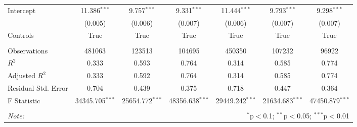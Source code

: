 \begin{tabular}{@{\extracolsep{5pt}}lcccccc}
Intercept & 11.386$^{***}$ & 9.757$^{***}$ & 9.331$^{***}$ & 11.444$^{***}$ & 9.793$^{***}$ & 9.298$^{***}$ \\
& (0.005) & (0.006) & (0.007) & (0.006) & (0.007) & (0.007) \\
Controls & True & True & True & True & True & True \\
\hline \\[-1.8ex]
 Observations & 481063 & 123513 & 104695 & 450350 & 107232 & 96922 \\
 $R^2$ & 0.333 & 0.593 & 0.764 & 0.314 & 0.585 & 0.774 \\
 Adjusted $R^2$ & 0.333 & 0.592 & 0.764 & 0.314 & 0.585 & 0.774 \\
 Residual Std. Error & 0.704  & 0.439  & 0.375  & 0.718  & 0.447  & 0.364  \\
 F Statistic & 34345.705$^{***}$  & 25654.772$^{***}$  & 48356.638$^{***}$  & 29449.242$^{***}$  & 21634.683$^{***}$  & 47450.879$^{***}$  \\
\hline
\hline \\[-1.8ex]
\textit{Note:} & \multicolumn{6}{r}{$^{*}$p$<$0.1; $^{**}$p$<$0.05; $^{***}$p$<$0.01} \\
\end{tabular}
